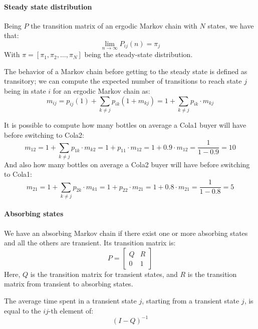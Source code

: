 \paragraph*{Steady state distribution}
Being $P$ the transition matrix of an ergodic Markov chain with $N$ states, we have that:
\[\lim_{n \rightarrow \infty}P_{ij}(n)=\pi_j\]
With $\pi=\left[ \pi_1,\pi_2,\dots,\pi_N \right]$ being the steady-state distribution.

The behavior of a Markov chain before getting to the steady state is defined as transitory; we can compute the expected number of transitions to reach state $j$ being in state $i$ for an ergodic Markov chain as:
\[m_{ij}=p_{ij}(1)+\sum_{k \neq j}p_{ik}(1+m_{kj})=1+\sum_{k \neq j}p_{ik}\cdot m_{kj}\]
\begin{example}
    It is possible to compute how many bottles on average a Cola1 buyer will have before switching to Cola2:
    \[m_{12}=1+\sum_{k \neq j}p_{1k}\cdot m_{k2}=1+p_{11}\cdot m_{12}=1+0.9\cdot m_{12}=\dfrac{1}{1-0.9}=10\]
    And also how many bottles on average a Cola2 buyer will have before switching to Cola1:
    \[m_{21}=1+\sum_{k \neq j}p_{2k}\cdot m_{k1}=1+p_{22}\cdot m_{21}=1+0.8\cdot m_{21}=\dfrac{1}{1-0.8}=5\]
\end{example}

\paragraph*{Absorbing states}
We have an absorbing Markov chain if there exist one or more absorbing states and all the others are transient.
Its transition matrix is:
\[P=
\begin{bmatrix}
    Q & R \\
    0 & 1
\end{bmatrix}\]
Here, $Q$ is the transition matrix for transient states, and $R$ is the transition matrix from transient to absorbing states.

The average time spent in a transient state $j$, starting from a transient state $j$, is equal to the $ij$-th element of:
\[(I-Q)^{-1}\]

